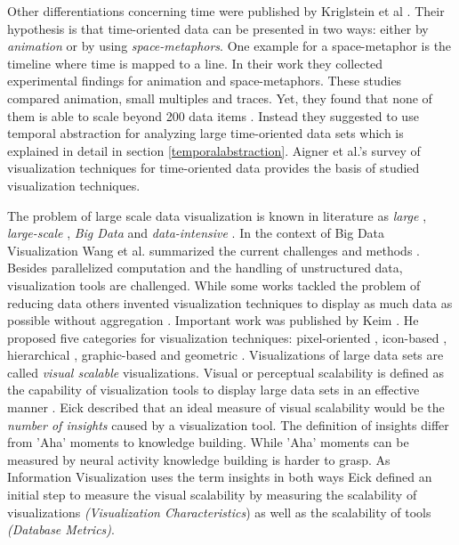 Other differentiations concerning time were published by Kriglstein et al \cite{Kriglstein2014}. Their hypothesis is that time-oriented data can be presented in two ways: either by \textit{animation} or by using \textit{space-metaphors}. One example for a space-metaphor is the timeline where time is mapped to a line. In their work they collected experimental findings for animation and space-metaphors. These studies compared animation,  small multiples and traces. Yet,  they found that none of them is able to scale beyond 200 data items  \cite{Robertson2013}. Instead they suggested to use temporal abstraction for analyzing large time-oriented data sets which is explained in detail in section \ref{temporalabstraction}.  Aigner et al.'s survey of visualization techniques for time-oriented data provides the basis of studied visualization techniques. 
\par
The problem of large scale data visualization is known in literature as
\textit{large}  \cite{PiringerHarald2011,  Keim2001,  Keim1996,  Tennekes2013,  Yang2003,  Keim2005,  Wickham2013}, \textit{large-scale}  \cite{Leonard2005,  PiringerHarald2011,  Cuzzocrea2011,  Keim2005},  \textit{Big Data} \cite{Patil,  Keahey2013,  Chen2012} and \textit{data-intensive}  \cite{PhilipChen2014,  S.MD.Mujeeb2005}.
In the context of Big Data Visualization Wang et al. summarized the current challenges and methods  \cite{Wang2015}. Besides parallelized computation and the handling of unstructured data,  visualization tools are challenged. While some works tackled the problem of reducing data others invented visualization techniques to display as much data as possible without aggregation  \cite{Krzywinski2009,  Luo2012,  Fekete2002}. Important work was published by Keim \cite{Keim1996}. He proposed five categories for visualization techniques: pixel-oriented \cite{Keim1995,  Stein2013,  Keim2000,  Keim1996pixel,  Keim2001,  Keim2005,  Keim2008},  icon-based \cite{Chung2014,  Borgo2013,  Fanea2005},  hierarchical  \cite{Yang2003, Shneiderman1992, LeBlanc1990},  graphic-based and geometric \cite{Noirhomme-Fraiture2002}. Visualizations of large data sets are called \textit{visual scalable} visualizations. Visual or perceptual scalability is defined as the capability of visualization tools to display large data sets in an effective manner  \cite{Eick2002}. Eick described that an ideal measure of visual scalability would be the \textit{number of insights} caused by a visualization tool\cite{Eick2002}. The definition of insights differ from 'Aha' moments to knowledge building. While 'Aha' moments can be measured by neural activity knowledge building is harder to grasp. As Information Visualization uses the term insights in both ways Eick defined an initial step to measure the visual scalability by measuring the scalability of visualizations \textit{(Visualization Characteristics}) as well as the scalability of tools \textit{(Database Metrics)}. 
